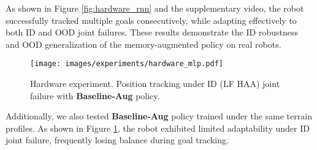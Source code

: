 As shown in Figure \ref{fig:hardware_rnn} and the supplementary video, the robot successfully tracked multiple goals consecutively, while adapting effectively to both ID and OOD joint failures.
These results demonstrate the ID robustness and OOD generalization of the memory-augmented policy on real robots.

\begin{figure}
\centering
\texttt{[image: images/experiments/hardware\_mlp.pdf]}
\caption{Hardware experiment. Position tracking under ID (LF HAA) joint failure with \textbf{Baseline-Aug} policy.}
\label{fig:hardware_mlp}
\end{figure}

Additionally, we also tested \textbf{Baseline-Aug} policy trained under the same terrain profiles. 
As shown in Figure \ref{fig:hardware_mlp}, the robot exhibited limited adaptability under ID joint failure, frequently losing balance during goal tracking.
